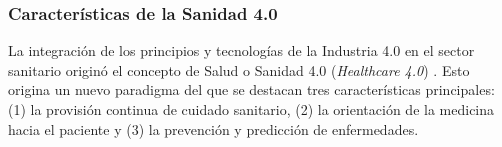 \subsubsection{Características de la Sanidad 4.0}

La integración de los principios y tecnologías de la Industria 4.0 en el sector sanitario originó el concepto de Salud o Sanidad 4.0 (\textit{Healthcare 4.0}) \cite{tortorella2020healthcare, tortorella2021impacts}.  %
Esto origina un nuevo paradigma del que se destacan tres  características principales: (1) la provisión continua de cuidado sanitario, (2) la orientación de la medicina hacia el paciente y (3) la prevención y predicción de enfermedades.



